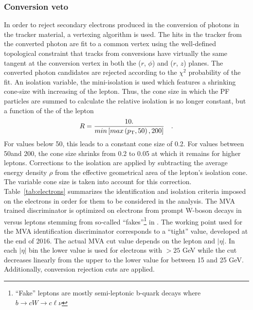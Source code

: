 \subsubsection*{Conversion veto}
\noindent\justify  
In order to reject secondary electrons produced in the conversion of photons in the tracker material, a vertexing algorithm is used. 
The hits in the tracker from the converted photon are fit to a common vertex using the well-defined topological constraint that tracks from conversions have virtually the same tangent at the conversion vertex in both the ($r$, $\phi$) and ($r$, $z$) planes. 
The converted photon candidates are rejected according to the $\chi^{2}$ probability of the fit.
\newpara
\noindent\justify  
An isolation variable, the mini-isolation is used which features a shrinking cone-size with increasing \pt of the lepton. 
Thus, the cone size in which the PF particles are summed to calculate the relative isolation is no longer constant, but a function of the \pt of the lepton
\begin{equation*}
    R = \frac{10.}{min\left[ max \left( p_{\mathrm{T}}, 50 \right), 200 \right]} \quad.
\end{equation*}
For \pt values below 50\GeV, this leads to a constant cone size of 0.2. 
For \pt values between 50\GeV and 200\GeV, the cone size shrinks from 0.2 to 0.05 at which it remains for higher \pt leptons.
Corrections to the isolation are applied by subtracting the average energy density $\rho$ from the effective geometrical area of the lepton's isolation cone. 
The variable cone size is taken into account for this correction.
Table~\ref{tab:electrons} summarizes the identification and isolation criteria imposed on the electrons in order for them to be considered in the analysis. 
The MVA trained discriminator is optimized on electrons from prompt W-boson decays in \ttbar versus leptons stemming from so-called ``fakes''\footnote{``Fake'' leptons are mostly semi-leptonic b-quark decays where $b \rightarrow cW \rightarrow c\ell \nu$} in \ttbar. 
The working point used for the MVA identification discriminator corresponds to a ``tight'' value, developed at the end of 2016. 
The actual MVA cut value depends on the lepton \pt and $|\eta|$. 
In each $|\eta|$ bin the lower value is used for electrons with \pt $> 25$ GeV while the cut decreases linearly from the upper to the lower value for \pt between 15 and 25 GeV. 
Additionally, conversion rejection cuts are applied.                        
